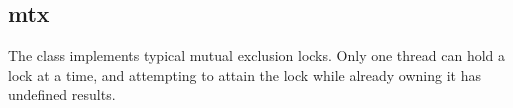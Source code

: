 %
%
%
%
%              

\subsection{mtx}
\label{mtx}

The  class implements typical mutual exclusion locks.  Only one
thread can hold a lock at a time, and attempting to attain the lock while
already owning it has undefined results.

